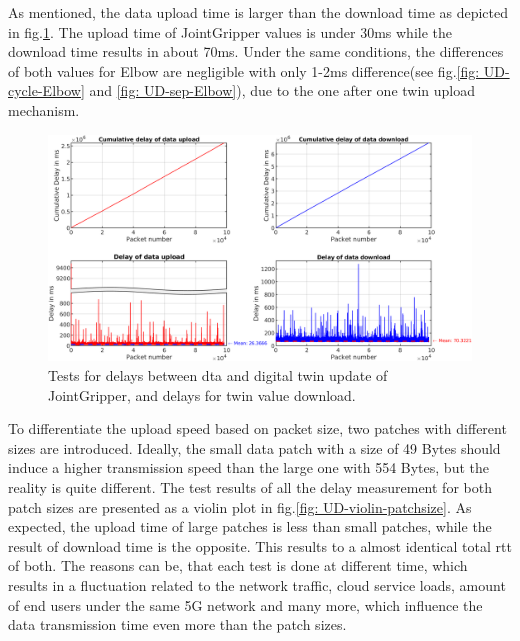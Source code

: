 As mentioned, the data upload time is larger than the download time as depicted in 
fig.\ref{fig: UD-sep-JointGripper}. The upload time of JointGripper values is 
under 30ms while the download time results in about 70ms. Under the same conditions, 
the differences of both values for Elbow are negligible with 
only 1-2ms difference(see fig.\ref{fig: UD-cycle-Elbow} and 
\ref{fig: UD-sep-Elbow}), due to the one after one twin upload mechanism. 




\begin{figure}[htb]
    \includegraphics[width=\textwidth]{figures/tests/DT/Delay_UploadDownload_JointGripper.png}
    \centering
    \caption{Tests for delays between \gls{dta} and digital twin update of JointGripper, 
    and delays for twin value download. \label{fig: UD-sep-JointGripper}}
\end{figure}


To differentiate the upload speed based on packet size, two patches with 
different sizes are introduced. Ideally, the small data patch with a size of 
49 Bytes should induce a higher transmission speed than the large one with 
554 Bytes, but the reality is quite different. The test results of all the 
delay measurement for both patch sizes are presented as a violin plot in 
fig.\ref{fig: UD-violin-patchsize}. As expected, the upload time of large 
patches is less than small patches, while the result of download time is the 
opposite. This results to a almost identical total \gls{rtt} of both. 
The reasons can be, that each test is done at different time, which results in 
a fluctuation related to the network traffic, cloud service loads, amount of 
end users under the same 5G network and many more, which influence the data transmission 
time even more than the patch sizes.

